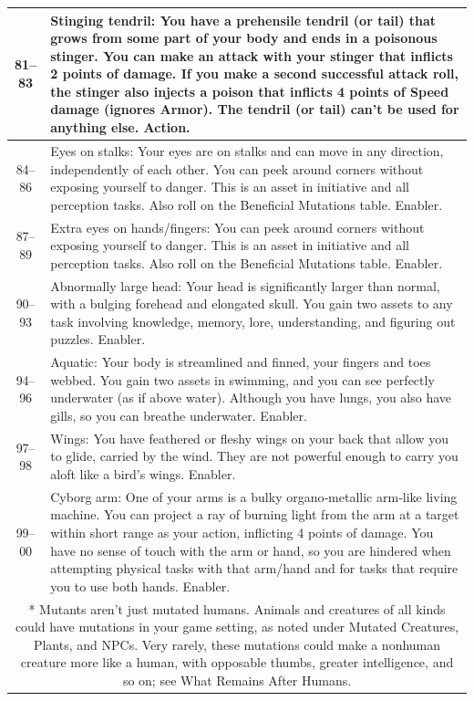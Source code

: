 \begin{longtable}{| c | p{15cm} |}
81–83 & Stinging tendril: You have a prehensile tendril (or tail) that grows from some part of your body and ends in a poisonous stinger. You can make an attack with your stinger that inflicts 2 points of damage. If you make a second successful attack roll, the stinger also injects a poison that inflicts 4 points of Speed damage (ignores Armor). The tendril (or tail) can’t be used for anything else. Action. \\ \hline
84–86 & Eyes on stalks: Your eyes are on stalks and can move in any direction, independently of each other. You can peek around corners without exposing yourself to danger. This is an asset in initiative and all perception tasks. Also roll on the Beneficial Mutations table. Enabler. \\ \hline
87–89 & Extra eyes on hands/fingers: You can peek around corners without exposing yourself to danger. This is an asset in initiative and all perception tasks. Also roll on the Beneficial Mutations table. Enabler. \\ \hline
90–93 & Abnormally large head: Your head is significantly larger than normal, with a bulging forehead and elongated skull. You gain two assets to any task involving knowledge, memory, lore, understanding, and figuring out puzzles. Enabler. \\ \hline
94–96 & Aquatic: Your body is streamlined and finned, your fingers and toes webbed. You gain two assets in swimming, and you can see perfectly underwater (as if above water). Although you have lungs, you also have gills, so you can breathe underwater. Enabler. \\ \hline
97–98 & Wings: You have feathered or fleshy wings on your back that allow you to glide, carried by the wind. They are not powerful enough to carry you aloft like a bird’s wings. Enabler. \\ \hline
99–00 & Cyborg arm: One of your arms is a bulky organo‑metallic arm‑like living machine. You can project a ray of burning light from the arm at a target within short range as your action, inflicting 4 points of damage. You have no sense of touch with the arm or hand, so you are hindered when attempting physical tasks with that arm/hand and for tasks that require you to use both hands. Enabler. \\ \hline

\multicolumn{2}{|p{15cm}|}{* Mutants aren’t just mutated humans. Animals and creatures of all kinds could have mutations in your game setting, as noted under Mutated Creatures, Plants, and NPCs. Very rarely, these mutations could make a nonhuman creature more like a human, with opposable thumbs, greater intelligence, and so on; see What Remains After Humans.} \\ \hline

\end{longtable}

